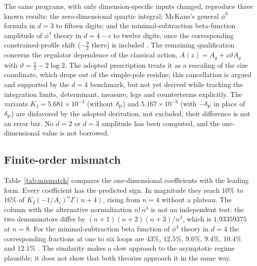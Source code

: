 \documentclass[11pt,a4paper]{article}
\numberwithin{equation}{section}
\newcommand{\Ae}{A_\epsilon}
\newcommand{\Ag}{A_g}
\newcommand{\sci}[2]{#1\times10^{#2}}
\begin{document}
The same programs, with only dimension-specific inputs changed, reproduce three known
results: the zero-dimensional quartic integral; McKane's general $\phi^6$ formula in
$d=3$ to fifteen digits; and the minimal-subtraction beta-function amplitude of $\phi^4$
theory in $d=4-\epsilon$ to twelve digits, once the corresponding constrained-profile
shift ($-\frac92$ there) is included \cite{McKane:2018ocs,McKaneWallaceBonfim}. The
remaining qualification concerns the regulator dependence of the classical action,
$A(z)=\Ag+z\vartheta\Ag$ with $\vartheta=\frac\pi2-2\log2$. The adopted prescription
treats it as a rescaling of the size coordinate, which drops out of the simple-pole
residue; this cancellation is argued and supported by the $d=4$ benchmark, but not yet
derived while tracking the integration limits, determinant, measure, legs and
counterterms explicitly. The variants $K_I=\sci{5.681}{-3}$ (without $\delta_{\rm p}$) and
$\sci{5.167}{-3}$ (with $-\delta_{\rm p}$ in place of $\delta_{\rm p}$) are disfavored by the
adopted derivation, not excluded;
their difference is not an error bar. No $d=2$ or $d=3$ amplitude has been computed, and
the one-dimensional value is not borrowed.

\subsection{Finite-order mismatch}\label{sec:mismatch}
Table~\ref{tab:mismatch} compares the one-dimensional coefficients with the leading
form. Every coefficient has the predicted sign. In magnitude they reach $10\%$ to $16\%$
of $K_I(-1/\Ae)^n\Gamma(n+4)$, rising from $n=4$ without a plateau. The column with the
alternative normalization $n!\,n^3$ is not an independent test: the two denominators
differ by $(n+1)(n+2)(n+3)/n^3$, which is $1.93359375$ at $n=8$. For the
minimal-subtraction beta function of $\phi^4$ theory in $d=4$ the corresponding fractions
at one to six loops are $43\%$, $12.5\%$, $9.6\%$, $9.4\%$, $10.4\%$ and $12.1\%$
\cite{Kompaniets:2017yct}. The similarity makes a slow approach to the asymptotic regime
plausible; it does not show that both theories approach it in the same way.
\end{document}
